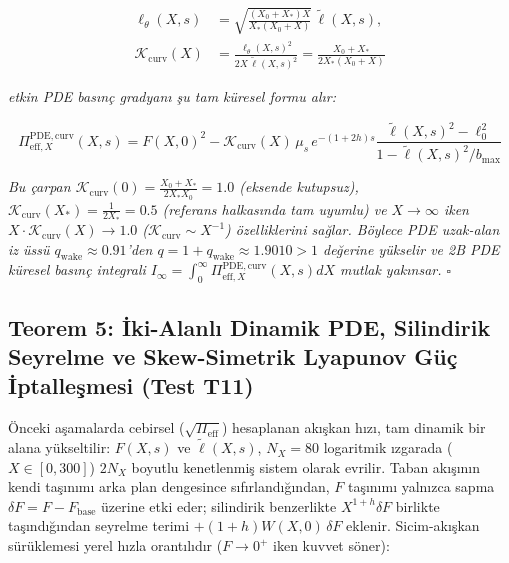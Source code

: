 \documentclass[12pt,a4paper]{article}
\begin{document}
\begin{equation}
\begin{split}
\ell_\theta(X, s) &= \sqrt{\frac{(X_0 + X_*) X}{X_* (X_0 + X)}} \, \tilde{\ell}(X, s), \\
\mathcal{K}_{\mathrm{curv}}(X) &= \frac{\ell_\theta(X, s)^2}{2 X \, \tilde{\ell}(X, s)^2} = \frac{X_0 + X_*}{2 X_* (X_0 + X)}
\label{eq:Kcurv}
\end{split}
\end{equation}

\textit{etkin PDE basınç gradyanı şu tam küresel formu alır:}

\begin{equation}
\Pi_{\mathrm{eff}, X}^{\mathrm{PDE, curv}}(X, s) = F(X, 0)^2 - \mathcal{K}_{\mathrm{curv}}(X) \, \mu_s \, e^{-(1+2h)s} \frac{\tilde{\ell}(X, s)^2 - \ell_0^2}{1 - \tilde{\ell}(X, s)^2 / b_{\max}}
\end{equation}

\textit{Bu çarpan $\mathcal{K}_{\mathrm{curv}}(0) = \frac{X_0+X_*}{2X_*X_0} = 1.0$ (eksende kutupsuz), $\mathcal{K}_{\mathrm{curv}}(X_*) = \frac{1}{2X_*} = 0.5$ (referans halkasında tam uyumlu) ve $X \to \infty$ iken $X \cdot \mathcal{K}_{\mathrm{curv}}(X) \to 1.0$ ($\mathcal{K}_{\mathrm{curv}} \sim X^{-1}$) özelliklerini sağlar. Böylece PDE uzak-alan iz üssü $q_{\mathrm{wake}} \approx 0.91$'den $q = 1 + q_{\mathrm{wake}} \approx 1.9010 > 1$ değerine yükselir ve 2B PDE küresel basınç integrali $I_\infty = \int_0^\infty \Pi_{\mathrm{eff}, X}^{\mathrm{PDE, curv}}(X, s) dX$ mutlak yakınsar. $\square$}

\subsection{Teorem 5: İki-Alanlı Dinamik PDE, Silindirik Seyrelme ve Skew-Simetrik Lyapunov Güç İptalleşmesi (Test T11)}

Önceki aşamalarda cebirsel ($\sqrt{\Pi_{\mathrm{eff}}}$) hesaplanan akışkan hızı, tam dinamik bir alana yükseltilir: $F(X, s)$ ve $\tilde{\ell}(X, s)$, $N_X = 80$ logaritmik ızgarada ($X \in [0, 300]$) $2 N_X$ boyutlu kenetlenmiş sistem olarak evrilir. Taban akışının kendi taşınımı arka plan dengesince sıfırlandığından, $F$ taşınımı yalnızca sapma $\delta F = F - F_{\mathrm{base}}$ üzerine etki eder; silindirik benzerlikte $X^{1+h} \delta F$ birlikte taşındığından seyrelme terimi $+(1+h) W(X,0) \, \delta F$ eklenir. Sicim-akışkan sürüklemesi yerel hızla orantılıdır ($F \to 0^+$ iken kuvvet söner):
\end{document}
